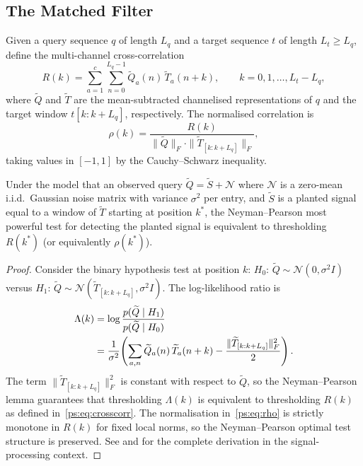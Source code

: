 \subsection{The Matched Filter}

Given a query sequence $q$ of length $L_q$ and a target sequence $t$ of length
$L_t \geq L_q$, define the multi-channel cross-correlation
\begin{equation}
  R(k) = \sum_{a=1}^{c} \sum_{n=0}^{L_q - 1}
    \widetilde{Q}_a(n)\, \widetilde{T}_a(n + k),
  \qquad k = 0, 1, \ldots, L_t - L_q,
  \label{ps:eq:crosscorr}
\end{equation}
where $\widetilde{Q}$ and $\widetilde{T}$ are the mean-subtracted channelised
representations of $q$ and the target window $t[k:k+L_q]$, respectively.
The normalised correlation is
\begin{equation}
  \rho(k) = \frac{R(k)}{\|\widetilde{Q}\|_F \cdot \|\widetilde{T}_{[k:k+L_q]}\|_F},
  \label{ps:eq:rho}
\end{equation}
taking values in $[-1, 1]$ by the Cauchy--Schwarz inequality.

\begin{theorem}
\label{ps:thm:optimal}
Under the model that an observed query $\widetilde{Q} = \widetilde{S} + \mathcal{N}$
where $\mathcal{N}$ is a zero-mean i.i.d.\ Gaussian noise matrix with variance
$\sigma^2$ per entry, and $\widetilde{S}$ is a planted signal equal to a window
of $\widetilde{T}$ starting at position $k^*$, the Neyman--Pearson most
powerful test for detecting the planted signal is equivalent to thresholding
$R(k^*)$ (or equivalently $\rho(k^*)$).
\end{theorem}

\begin{proof}
Consider the binary hypothesis test at position $k$:
$H_0$: $\widetilde{Q} \sim \mathcal{N}(0, \sigma^2 I)$ versus
$H_1$: $\widetilde{Q} \sim \mathcal{N}(\widetilde{T}_{[k:k+L_q]}, \sigma^2 I)$.
The log-likelihood ratio is
\begin{align}
  \Lambda(k) &= \log \frac{p(\widetilde{Q} \mid H_1)}{p(\widetilde{Q} \mid H_0)} \notag \\
  &= \frac{1}{\sigma^2}\!\left(
      \sum_{a,n} \widetilde{Q}_a(n)\, \widetilde{T}_a(n+k)
      - \frac{\|\widetilde{T}_{[k:k+L_q]}\|_F^2}{2}
    \right).
\end{align}
The term $\|\widetilde{T}_{[k:k+L_q]}\|_F^2$ is constant with respect to
$\widetilde{Q}$, so the Neyman--Pearson lemma \citep{neyman1933} guarantees
that thresholding $\Lambda(k)$ is equivalent to thresholding $R(k)$ as defined
in~\eqref{ps:eq:crosscorr}. The normalisation in~\eqref{ps:eq:rho} is strictly
monotone in $R(k)$ for fixed local norms, so the Neyman--Pearson optimal test
structure is preserved. See \citet{turin1960} and \citet{kay1998} for the
complete derivation in the signal-processing context.
\end{proof}

